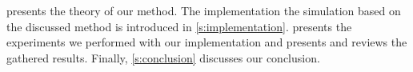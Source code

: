  presents the theory of our method. The implementation the simulation based on the discussed method is introduced in \cref{s:implementation}.  presents the experiments we performed with our implementation and presents and reviews the gathered results. Finally, \cref{s:conclusion} discusses our conclusion.
